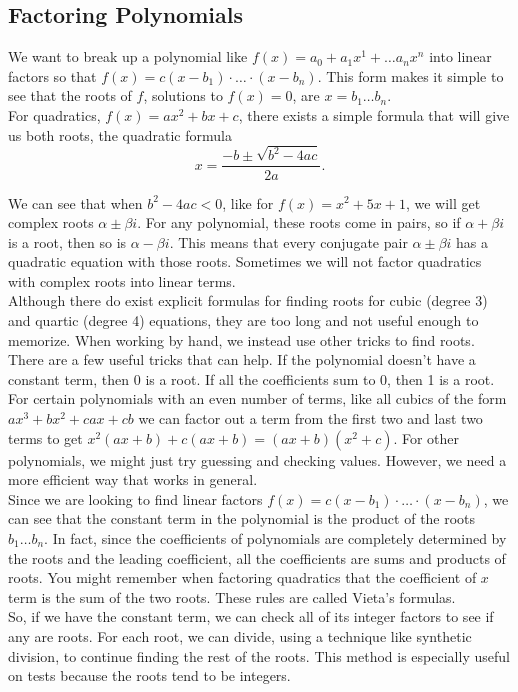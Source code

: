 \subsection{Factoring Polynomials}

We want to break up a polynomial like $f(x) = a_0 + a_1x^1 + \ldots a_nx^n$ into linear factors so that $f(x) = c(x-b_1)\cdot \ldots \cdot(x - b_n)$. This form makes it simple to see that the roots of $f$, solutions to $f(x) = 0$, are $x = b_1 \ldots b_n$.\\


For quadratics, $f(x) = ax^2 + bx + c$, there exists a simple formula that will give us both roots, the quadratic formula
\begin{equation*}
	x = \frac{-b \pm \sqrt{b^2-4ac}}{2a}.
\end{equation*}


We can see that when $b^2 - 4ac < 0$, like for $f(x) = x^2 + 5x + 1$, we will get complex roots $\alpha \pm \beta i$. For any polynomial, these roots come in pairs, so if $\alpha + \beta i$ is a root, then so is $\alpha - \beta i$. This means that every conjugate pair $\alpha \pm \beta i$ has a quadratic equation with those roots. Sometimes we will not factor quadratics with complex roots into linear terms.\\


Although there do exist explicit formulas for finding roots for cubic (degree 3) and quartic (degree 4) equations, they are too long and not useful enough to memorize. When working by hand, we instead use other tricks to find roots.\\


There are a few useful tricks that can help. If the polynomial doesn't have a constant term, then 0 is a root. If all the coefficients sum to 0, then 1 is a root. For certain polynomials with an even number of terms, like all cubics of the form $ax^3 + bx^2 + cax + cb$ we can factor out a term from the first two and last two terms to get $x^2(ax+b)+c(ax+b) = (ax+b)(x^2+c)$. For other polynomials, we might just try guessing and checking values. However, we need a more efficient way that works in general.\\


Since we are looking to find linear factors $f(x) = c(x-b_1)\cdot \ldots \cdot(x-b_n)$, we can see that the constant term in the polynomial is the product of the roots $b_1 \ldots b_n$. In fact, since the coefficients of polynomials are completely determined by the roots and the leading coefficient, all the coefficients are sums and products of roots. You might remember when factoring quadratics that the coefficient of $x$ term is the sum of the two roots. These rules are called Vieta's formulas.\\


So, if we have the constant term, we can check all of its integer factors to see if any are roots. For each root, we can divide, using a technique like synthetic division, to continue finding the rest of the roots. This method is especially useful on tests because the roots tend to be integers.

